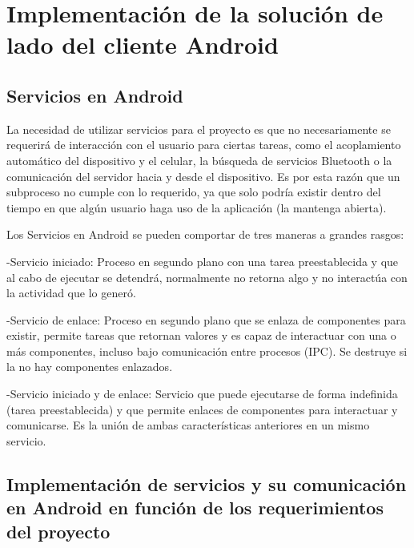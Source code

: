 \chapter{Implementación de la solución de lado del cliente Android}\label{servicios}

\section{Servicios en Android}

La necesidad de utilizar servicios para el proyecto es que no necesariamente se requerirá de interacción con el usuario para ciertas tareas, como el acoplamiento automático del dispositivo y el celular, la búsqueda de servicios Bluetooth o la comunicación del servidor hacia y desde el dispositivo. Es por esta razón que un subproceso no cumple con lo requerido, ya que solo podría existir dentro del tiempo en que algún usuario haga uso de la aplicación (la mantenga abierta).

Los Servicios\cite{services} en Android se pueden comportar de tres maneras a grandes rasgos:
	
	-Servicio iniciado: Proceso en segundo plano con una tarea preestablecida y que al cabo de ejecutar se detendrá, normalmente no retorna algo y no interactúa con la actividad que lo generó.

	-Servicio de enlace: Proceso en segundo plano que se enlaza de componentes para existir, permite tareas que retornan valores y es capaz de interactuar con una o más componentes, incluso bajo comunicación entre procesos (IPC). Se destruye si la no hay componentes enlazados.

	-Servicio iniciado y de enlace: Servicio que puede ejecutarse de forma indefinida (tarea preestablecida) y que permite enlaces de componentes para interactuar y comunicarse. Es la unión de ambas características anteriores en un mismo servicio.


\newpage

\section{Implementación de servicios y su comunicación en Android en función de los requerimientos del proyecto}

